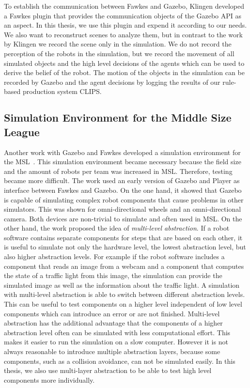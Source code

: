 To establish the communication between Fawkes and Gazebo, Klingen developed a Fawkes plugin that provides the communication objects of the Gazebo API as an aspect. In this thesis, we use this plugin and expend it according to our needs. We also want to reconstruct scenes to analyze them, but in contrast to the work by Klingen we record the scene only in the simulation. We do not record the perception of the robots in the simulation, but we record the movement of all simulated objects and the high level decisions of the agents which can be used to derive the belief of the robot. The motion of the objects in the simulation can be recorded by Gazebo and the agent decisions by logging the results of our rule-based production system CLIPS.

\subsection{Simulation Environment for the Middle Size League}
Another work with Gazebo and Fawkes developed a simulation environment for the MSL~\cite{MultiLevelAbstraction}. This simulation environment became necessary because the field size and the amount of robots per team was increased in MSL. Therefore, testing became more difficult. The work used an early version of Gazebo and Player as interface between Fawkes and Gazebo. On the one hand, it showed that Gazebo is capable of simulating complex robot components that cause problems in other simulators. This was shown for omni-directional wheels and an omni-directional camera. Both devices are non-trivial to simulate and often used in MSL. On the other hand, the work proposed the idea of \textit{multi-level abstraction}. If a robot software contains separate components for steps that are based on each other, it is useful to simulate not only the hardware level, the lowest abstraction level, but also higher abstraction levels. For example if the robot software includes a component that reads an image from a webcam and a component that computes the state of a traffic light from this image, the simulation can provide the simulated image as well as the information about the traffic light. A simulation with multi-level abstraction is able to switch between different abstraction levels. This can be useful to test components on a higher level independent of low level components which can introduce an error or are not finished. Multi-level abstraction has the additional advantage that the components of a higher abstraction level often can be simulated with less computational effort. This makes it easier to run the simulation on a slow computer. However it is not always reasonable to introduce multiple abstraction layers, because some components, such as a collision avoidance, can not be simulated easily. In this thesis, we also use multi-layer abstraction to be able to test high level components more individually.



